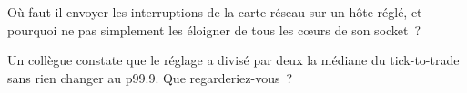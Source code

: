 \begin{interviewq}\label{iq:ll:linux-tuning:5}
Où faut-il envoyer les interruptions de la carte réseau sur un hôte réglé, et pourquoi ne pas simplement les éloigner de tous les cœurs de son socket~?
\end{interviewq}

\begin{interviewq}\label{iq:ll:linux-tuning:6}
Un collègue constate que le réglage a divisé par deux la médiane du tick-to-trade sans rien changer au p99.9. Que regarderiez-vous~?
\end{interviewq}
